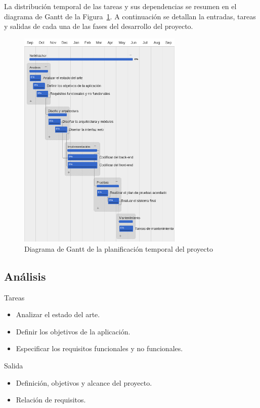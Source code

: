 La distribución temporal de las tareas y sus dependencias se resumen en el diagrama de Gantt de la Figura~\ref{fig:gantt}.
A continuación se detallan la entradas, tareas y salidas de cada una de las fases del desarrollo del proyecto.

\begin{figure}[!htp]
  \centering
  \includegraphics[width=0.7\textwidth,clip=true]{graphics/gantt_white}
  \caption{Diagrama de Gantt de la planificación temporal del proyecto}
  \label{fig:gantt}
\end{figure}

\subsection*{Análisis\label{ssec:dp:analisis}}

Tareas
\begin{itemize}[leftmargin=3.5em]
  \item Analizar el estado del arte.
  \item Definir los objetivos de la aplicación.
  \item Especificar los requisitos funcionales y no funcionales.
\end{itemize}

Salida
\begin{itemize}[leftmargin=3.5em]
  \item Definición, objetivos y alcance del proyecto.
  \item Relación de requisitos.
\end{itemize}


